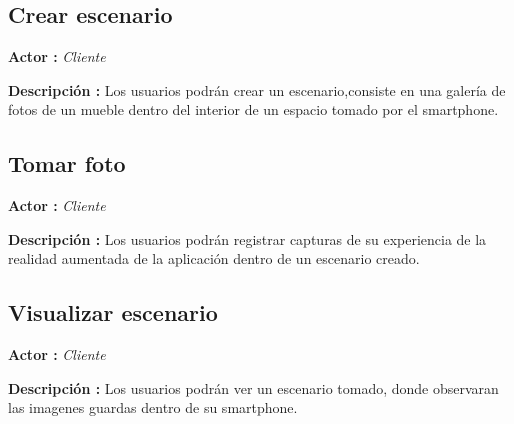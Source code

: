 \subsection{Crear escenario}
\textbf{Actor :} \textit{Cliente} \par
\textbf{Descripción :} Los usuarios podrán crear un escenario,consiste en una galería de fotos de un mueble dentro del interior de un espacio tomado por el smartphone.

\subsection{Tomar foto}
\textbf{Actor :} \textit{Cliente} \par
\textbf{Descripción :} Los usuarios podrán registrar capturas de su experiencia de la realidad aumentada de la aplicación dentro de un escenario creado.

\subsection{Visualizar escenario}
\textbf{Actor :} \textit{Cliente} \par
\textbf{Descripción :} Los usuarios podrán ver un escenario tomado, donde observaran las imagenes guardas dentro de su smartphone.